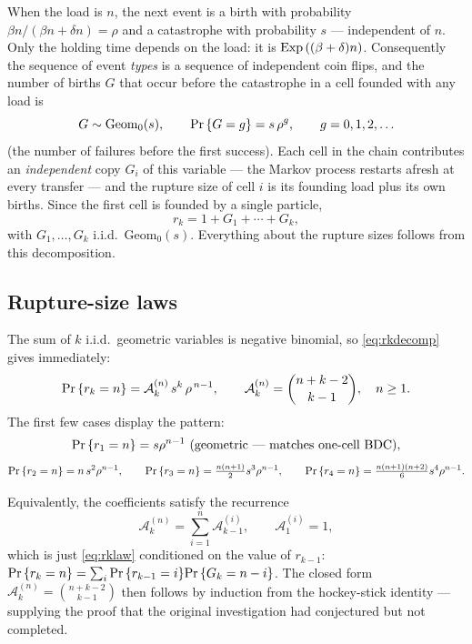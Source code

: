 When the load is $n$, the next event is a birth with probability
$\beta n/(\beta n+\delta n)=\rho$ and a catastrophe with probability $s$
--- independent of $n$. Only the holding time depends on the load: it is
$\mathrm{Exp}\left((\beta+\delta)n\right)$. Consequently the sequence of event
\emph{types} is a sequence of independent coin flips, and the number of
births $G$ that occur before the catastrophe in a cell founded with any load
is
\begin{equation}
G\sim\mathrm{Geom}_0(s),
\qquad
{\text{Pr}\left\{G=g\right\}}=s\,\rho^g,\qquad g=0,1,2,\ldots
\end{equation}
(the number of failures before the first success). Each cell in the chain
contributes an \emph{independent} copy $G_i$ of this variable --- the Markov
process restarts afresh at every transfer --- and the rupture size of cell
$i$ is its founding load plus its own births. Since the first cell is
founded by a single particle,
\begin{equation}
r_k = 1 + G_1 + \cdots + G_k,
\label{eq:rkdecomp}
\end{equation}
with $G_1,\ldots,G_k$ i.i.d.\ $\mathrm{Geom}_0(s)$. Everything about the
rupture sizes follows from this decomposition.

\subsection{Rupture-size laws}

The sum of $k$ i.i.d.\ geometric variables is negative binomial, so
\eqref{eq:rkdecomp} gives immediately:
\begin{equation}
{\text{Pr}\left\{r_k=n\right\}}=\mathcal{A}^{(n)}_{k}\,s^{k}\,\rho^{\,n-1},
\qquad
\mathcal{A}^{(n)}_{k}=\binom{n+k-2}{k-1},
\quad n\ge1.
\label{eq:rklaw}
\end{equation}
The first few cases display the pattern:
\begin{equation}
{\text{Pr}\left\{r_1=n\right\}}=s\rho^{n-1}\ \text{(geometric --- matches one-cell BDC)},
\end{equation}
\begin{equation}
{\text{Pr}\left\{r_2=n\right\}}=n\,s^2\rho^{n-1},
\qquad
{\text{Pr}\left\{r_3=n\right\}}=\tfrac{n(n+1)}{2}s^3\rho^{n-1},
\qquad
{\text{Pr}\left\{r_4=n\right\}}=\tfrac{n(n+1)(n+2)}{6}s^4\rho^{n-1}.
\end{equation}

Equivalently, the coefficients satisfy the recurrence
\begin{equation}
\mathcal{A}^{(n)}_{k}=\sum_{i=1}^{n}\mathcal{A}^{(i)}_{k-1},
\qquad
\mathcal{A}^{(i)}_{1}=1,
\end{equation}
which is just \eqref{eq:rklaw} conditioned on the value of $r_{k-1}$:
${\text{Pr}\left\{r_k=n\right\}}=\sum_i{\text{Pr}\left\{r_{k-1}=i\right\}}{\text{Pr}\left\{G_k=n-i\right\}}$. The closed form
$\mathcal{A}^{(n)}_{k}=\binom{n+k-2}{k-1}$ then follows by induction from
the hockey-stick identity --- supplying the proof that the original
investigation had conjectured but not completed.

